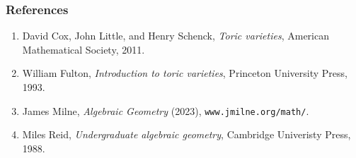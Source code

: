 \documentclass{beamer}
\theoremstyle{definition}
\theoremstyle{definition}
\begin{document}
\begin{frame}
\frametitle{References}
\begin{enumerate}%
\item[]
David Cox, John Little, and Henry Schenck,
\emph{Toric varieties},
American Mathematical Society, 2011.

\vspace{0.5cm}

\item[]
William Fulton,
\emph{Introduction to toric varieties},
Princeton University Press, 1993.

\vspace{0.5cm}

\item[]
James Milne,
\emph{Algebraic Geometry} (2023),
{ \texttt{www.jmilne.org/math/}}. %

\vspace{0.5cm}

\item[]
Miles Reid,
\emph{Undergraduate algebraic geometry},
Cambridge Univeristy Press, 1988.
\end{enumerate}
\end{frame}
\end{document}
